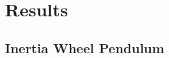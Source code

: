 \documentclass{beamer}
\begin{document}





\section{Results}

\subsection{Inertia Wheel Pendulum}
\end{document}
